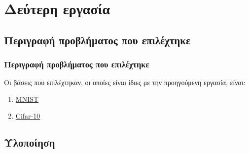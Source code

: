 \documentclass{beamer}
\begin{document}
\section{Δεύτερη εργασία}

\subsection{Περιγραφή προβλήματος που επιλέχτηκε}

\begin{frame}
\frametitle{Περιγραφή προβλήματος που επιλέχτηκε}

Οι βάσεις που επιλέχτηκαν, οι οποίες είναι ίδιες με την προηγούμενη εργασία,
είναι:

\begin{enumerate}
\item \href{http://yann.lecun.com/exdb/mnist/}{MNIST}
\item \href{https://www.cs.toronto.edu/~kriz/cifar.html}{Cifar-10}
\end{enumerate}

\end{frame}

\subsection{Υλοποίηση}
\end{document}
